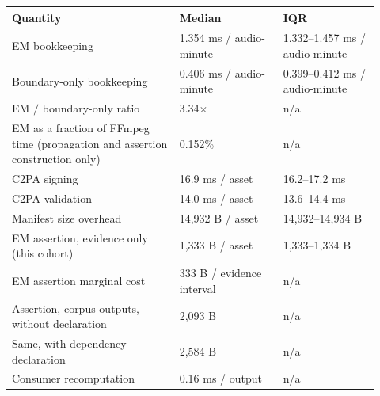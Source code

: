 \begin{tabular}{p{0.42\linewidth}p{0.26\linewidth}p{0.24\linewidth}}
\toprule
Quantity & Median & IQR \\
\midrule
EM bookkeeping & 1.354 ms / audio-minute & 1.332--1.457 ms / audio-minute \\
Boundary-only bookkeeping & 0.406 ms / audio-minute & 0.399--0.412 ms / audio-minute \\
EM $/$ boundary-only ratio & 3.34$\times$ & n/a \\
EM as a fraction of FFmpeg time (propagation and assertion construction only) & 0.152\% & n/a \\
C2PA signing & 16.9 ms / asset & 16.2--17.2 ms \\
C2PA validation & 14.0 ms / asset & 13.6--14.4 ms \\
Manifest size overhead & 14,932 B / asset & 14,932--14,934 B \\
EM assertion, evidence only (this cohort) & 1,333 B / asset & 1,333--1,334 B \\
EM assertion marginal cost & 333 B / evidence interval & n/a \\
Assertion, corpus outputs, without declaration & 2,093 B & n/a \\
Same, with dependency declaration & 2,584 B & n/a \\
Consumer recomputation & 0.16 ms / output & n/a \\
\bottomrule
\end{tabular}
